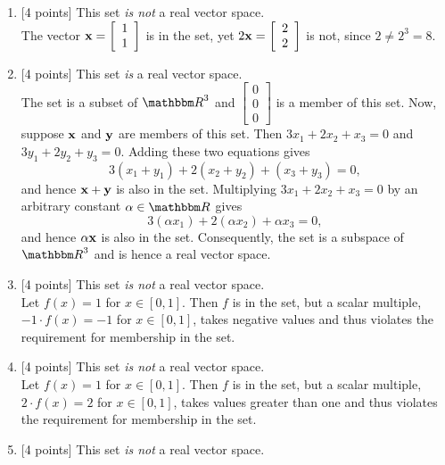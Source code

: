 \begin{solution}
\begin{enumerate}
\item {[4 points]} This set \emph{is not} a real vector space.\\
The vector $\displaystyle{{\bf x}= \left[\begin{array}{c}1\\ 1\end{array}\right]}$  is in the set, yet $\displaystyle{2{\bf x}= \left[\begin{array}{c}2\\ 2\end{array}\right]}$ is not, since $2 \ne 2^3 = 8$.
\\
\item {[4 points]} This set \emph{is} a real vector space.\\
The set is a subset of $\R^3$ and $\left[\begin{array}{c} 0 \\ 0 \\ 0\end{array}\right]$ is a member of this set. Now, suppose ${\bf x}$ and ${\bf y}$ are members of this set. Then $3x_1 + 2x_2 + x_3 = 0$ and  $3y_1 + 2y_2 + y_3 = 0$. Adding these two equations gives
\[
 3(x_1+y_1) + 2(x_2+y_2) + (x_3+y_3) = 0,
\]
and hence ${\bf x} + {\bf y}$ is also in the set. Multiplying $3x_1 + 2x_2 + x_3 = 0$ by an arbitrary constant $\alpha\in\R$ gives
\[
3(\alpha x_1) + 2(\alpha x_2) + \alpha x_3 = 0,
\]
and hence $\alpha {\bf x}$ is also in the set. Consequently, the set is a subspace of $\R^3$ and is hence a real vector space.
\\
\item {[4 points]} This set \emph{is not} a real vector space.\\
Let $f(x) = 1$ for $x\in[0,1]$. Then $f$ is in the set, but a scalar multiple, $-1\cdot f(x) = -1$ for $x\in[0,1]$, takes negative values and thus violates the requirement for membership in the set.
\\
\item {[4 points]} This set \emph{is not} a real vector space.\\
Let $f(x) = 1$ for $x\in[0,1]$. Then $f$ is in the set, but a scalar multiple, $2\cdot f(x) = 2$ for $x\in[0,1]$, takes values greater than one and thus violates the requirement for membership in the set.
\\
\item {[4 points]} This set \emph{is not} a real vector space.\\

\end{enumerate}
\end{solution}
